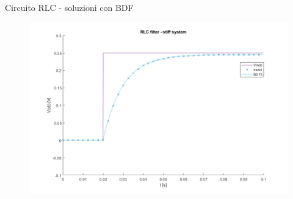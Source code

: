 \documentclass[aspectratio=169, 10pt, handout,usenames,dvipsnames]{beamer}
\begin{document}
 \begin{frame}{Circuito RLC - soluzioni con BDF}
    \begin{figure}
        \centering
        \includegraphics[width=.8\linewidth]{rlc_solution_comparison.png}
        \label{fig:my_label}
    \end{figure}
 \end{frame}

\end{document}
